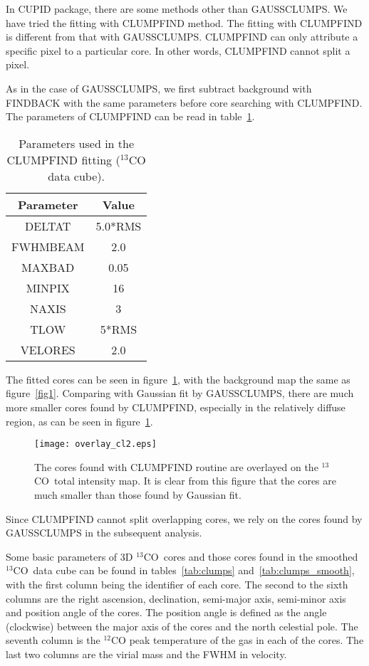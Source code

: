 \documentclass[12pt,preprint]{aastex}
\def\13co{$^{13}$CO}
\begin{document}
In CUPID package, there are some methods other than GAUSSCLUMPS. We have tried the fitting with CLUMPFIND method.
The fitting with CLUMPFIND is different from that with GAUSSCLUMPS. CLUMPFIND can only attribute a specific pixel to a particular core.
In other words, CLUMPFIND cannot split a pixel.

As in the case of GAUSSCLUMPS, we first subtract background with FINDBACK with the same parameters before core searching
with CLUMPFIND. The parameters of CLUMPFIND can be read in table~\ref{clumpfindpara}.


\begin{table}[htb]
\begin{center}
\caption{Parameters used in the CLUMPFIND fitting ($^{13}$CO data cube). \label{clumpfindpara}}
\begin{tabular}{|c|c|}
\hline \hline  Parameter & Value \\
\hline
DELTAT      & 5.0*RMS  \\\hline
FWHMBEAM    & 2.0     \\\hline
MAXBAD      & 0.05    \\\hline
MINPIX      & 16      \\\hline
NAXIS       & 3       \\\hline
TLOW        & 5*RMS   \\\hline
VELORES     & 2.0     \\\hline
\hline
\end{tabular}
\end{center}
\footnotesize \it
\end{table}


The fitted cores can be seen in figure~\ref{overlay_cl}, with the background map the same as figure~\ref{fig1}. Comparing with Gaussian fit by GAUSSCLUMPS,
there are much more smaller cores found by CLUMPFIND, especially in the relatively diffuse region, as can be seen in figure~\ref{overlay_cl}.
\begin{figure}[htb]
\texttt{[image: overlay\_cl2.eps]}
\caption{ The cores found with CLUMPFIND routine are overlayed on the \13co\ total intensity map. It is clear
from this figure that the cores are much smaller than those found by Gaussian fit.
 \label{overlay_cl}}
\end{figure}


Since CLUMPFIND cannot split overlapping cores, we rely on the cores found by GAUSSCLUMPS in the subsequent analysis.

Some basic parameters of 3D \13co\ cores and those cores found in the smoothed \13co\ data cube
can be found in tables~\ref{tab:clumps} and~\ref{tab:clumps_smooth}, with the first column being the identifier of each core.
The second to the sixth columns are the right ascension, declination, semi-major axis,
semi-minor axis and position angle of the cores. The position angle is defined as the angle (clockwise)  between the major axis of the cores and the north celestial pole. The seventh column is the $^{12}$CO peak temperature of the gas in each of the cores. The last two columns are the virial mass and the FWHM
in velocity.
\end{document}
